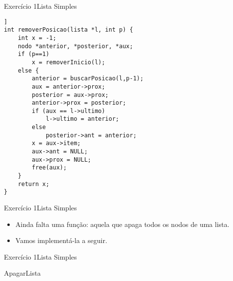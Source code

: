 \documentclass[aspectratio=169]{beamer}
\begin{document}

\begin{frame}[fragile]{Exercício 1}{Lista Simples}
\begin{lstlisting}[style=CStyle,basicstyle=\tiny]]
int removerPosicao(lista *l, int p) {
    int x = -1;
    nodo *anterior, *posterior, *aux;
    if (p==1)
        x = removerInicio(l);
    else {    
        anterior = buscarPosicao(l,p-1);
        aux = anterior->prox;
        posterior = aux->prox;
        anterior->prox = posterior;
        if (aux == l->ultimo)
            l->ultimo = anterior;
        else 
            posterior->ant = anterior;
        x = aux->item;
        aux->ant = NULL;
        aux->prox = NULL;
        free(aux);
    }
    return x;    
}	
\end{lstlisting}  
\end{frame}


\begin{frame}[fragile]{Exercício 1}{Lista Simples}
\begin{itemize}
\item Ainda falta uma função: aquela que apaga todos os nodos de uma lista.
\item Vamos implementá-la a seguir.
\end{itemize}
\end{frame}



\begin{frame}[fragile]{Exercício 1}{Lista Simples}
\begin{algorithm}[H]
\caption{ApagarLista} 
\label{ApagarLista}
\end{algorithm}
\end{frame}

\end{document}
